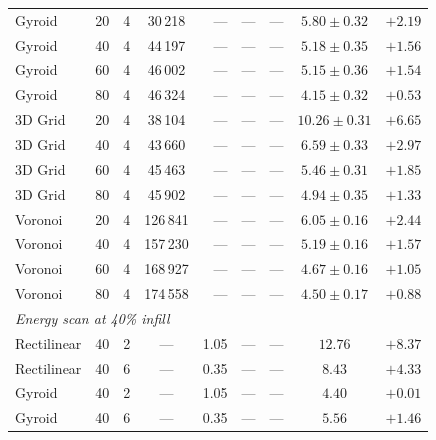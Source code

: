 \documentclass[final,5p,times,twocolumn]{elsarticle}
\begin{document}
\begin{table}[t]
{\begin{tabular}{llccrcccc}
Gyroid      & 20 & 4 & 30\,218 & --- & --- & --- & $5.80\pm0.32$  & $+2.19$ \\
Gyroid      & 40 & 4 & 44\,197 & --- & --- & --- & $5.18\pm0.35$  & $+1.56$ \\
Gyroid      & 60 & 4 & 46\,002 & --- & --- & --- & $5.15\pm0.36$  & $+1.54$ \\
Gyroid      & 80 & 4 & 46\,324 & --- & --- & --- & $4.15\pm0.32$  & $+0.53$ \\
3D Grid     & 20 & 4 & 38\,104 & --- & --- & --- & $10.26\pm0.31$ & $+6.65$ \\
3D Grid     & 40 & 4 & 43\,660 & --- & --- & --- & $6.59\pm0.33$  & $+2.97$ \\
3D Grid     & 60 & 4 & 45\,463 & --- & --- & --- & $5.46\pm0.31$  & $+1.85$ \\
3D Grid     & 80 & 4 & 45\,902 & --- & --- & --- & $4.94\pm0.35$  & $+1.33$ \\
Voronoi     & 20 & 4 & 126\,841 & --- & --- & --- & $6.05\pm0.16$ & $+2.44$ \\
Voronoi     & 40 & 4 & 157\,230 & --- & --- & --- & $5.19\pm0.16$ & $+1.57$ \\
Voronoi     & 60 & 4 & 168\,927 & --- & --- & --- & $4.67\pm0.16$ & $+1.05$ \\
Voronoi     & 80 & 4 & 174\,558 & --- & --- & --- & $4.50\pm0.17$ & $+0.88$ \\
\midrule
\multicolumn{9}{l}{\emph{Energy scan at 40\% infill}} \\
Rectilinear & 40 & 2 & --- & 1.05 & --- & --- & $12.76$ & $+8.37$ \\
Rectilinear & 40 & 6 & --- & 0.35 & --- & --- & $8.43$  & $+4.33$ \\
Gyroid      & 40 & 2 & --- & 1.05 & --- & --- & $4.40$  & $+0.01$ \\
Gyroid      & 40 & 6 & --- & 0.35 & --- & --- & $5.56$  & $+1.46$ \\
\bottomrule
\end{tabular}%
}
\end{table}
\end{document}
